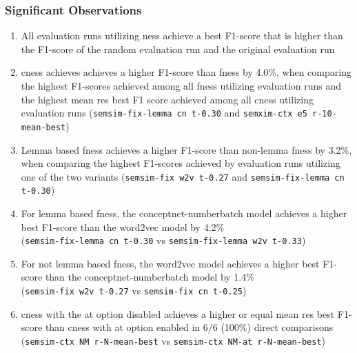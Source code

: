 \documentclass[11pt, numbers=noenddot]{scrreprt}
\newcounter{listcounter}
\begin{document}
\subsubsection{Significant Observations}
\begin{enumerate}[label=\arabic{listcounter}.\arabic*]
	\item All evaluation runs utilizing \gls{ness} achieve a best F1-score that is higher than the F1-score of the random evaluation run and the original evaluation run \label{obs-itm:ness-higher-best-f1}
	\item \gls{cness} achieves achieves a higher F1-score than \gls{fness} by 4.0\%, when comparing the highest F1-scores achieved among all \gls{fness} utilizing evaluation runs and the highest mean \gls{res} best F1 score achieved among all \gls{cness} utilizing evaluation runs (\texttt{semsim-fix-lemma cn t-0.30} and \texttt{semxim-ctx e5 r-10-mean-best}) \label{obs-itm:cness-higher-best-f1-than-fness}
	\item Lemma based \gls{fness} achieves a higher F1-score than non-lemma \gls{fness} by 3.2\%, when comparing the highest F1-scores achieved by evaluation runs utilizing one of the two variants (\texttt{semsim-fix w2v t-0.27} and \texttt{semsim-fix-lemma cn t-0.30}) \label{obs-itm:lemma-based-fness-higher-best-f1}
	\item For lemma based \gls{fness}, the conceptnet-numberbatch model achieves a higher best F1-score than the word2vec model by 4.2\% \\ (\texttt{semsim-fix-lemma cn t-0.30} vs \texttt{semsim-fix-lemma w2v t-0.33}) \label{obs-itm:lemma-fness-cn-better-than-w2v}
	\item For not lemma based \gls{fness}, the word2vec model achieves a higher best F1-score than the conceptnet-numberbatch model by 1.4\% \\ (\texttt{semsim-fix w2v t-0.27} vs \texttt{semsim-fix cn t-0.25}) \label{obs-itm:word-fness-w2v-better-than-cn}
	\item \gls{cness} with the \gls{at} option disabled achieves a higher or equal mean \gls{res} best F1-score than \gls{cness} with \gls{at} option enabled in 6/6 (100\%) direct comparisons \\(\texttt{semsim-ctx NM r-N-mean-best} vs \texttt{semsim-ctx NM-at r-N-mean-best}) \label{obs-itm:cness-better-without-AT}

\end{enumerate}
\end{document}
